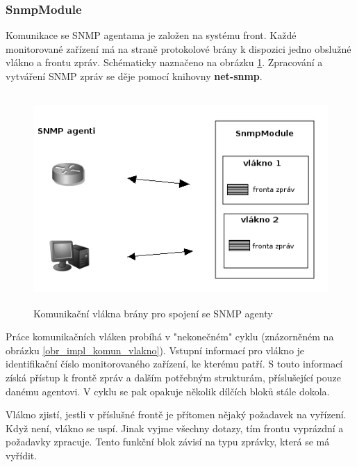 \subsubsection*{SnmpModule}
Komunikace se SNMP agentama je založen na systému front. Každé monitorované zařízení má na straně protokolové brány k dispozici jedno obslužné vlákno
a frontu zpráv. Schématicky naznačeno na obrázku \ref{obr_impl_snmp_komunikace}. Zpracování a vytváření SNMP zpráv se děje pomocí knihovny \textbf{net-snmp}.
\begin{figure}[htp]
	\begin{center}
		\includegraphics[width=14cm,height=8cm]{obrazky/05_snmp_komunikace.png}
		\caption{Komunikační vlákna brány pro spojení se SNMP agenty}
		\label{obr_impl_snmp_komunikace}
	\end{center}
\end{figure}

Práce komunikačních vláken probíhá v "nekonečném" cyklu (znázorněném na obrázku \ref{obr_impl_komun_vlakno}). Vstupní informací pro vlákno je identifikační
číslo monitorovaného zařízení, ke kterému patří. S touto informací získá přístup k frontě zpráv a dalším potřebným strukturám, příslušející pouze danému agentovi.
V cyklu se pak opakuje několik dílčích bloků stále dokola.

Vlákno zjistí, jestli v příslušné frontě je přítomen nějaký požadavek na vyřízení. Když není, vlákno se uspí. Jinak vyjme všechny dotazy, tím frontu vyprázdní a
požadavky zpracuje. Tento funkční blok závisí na typu zprávky, která se má vyřídit. 

